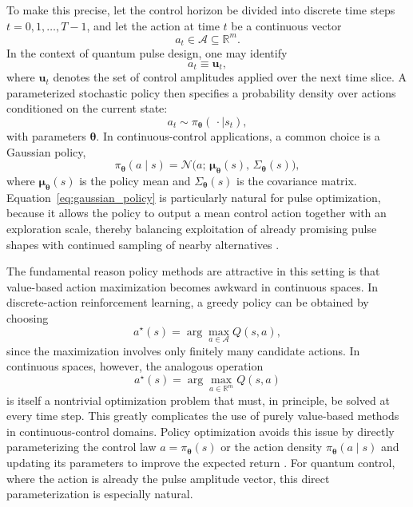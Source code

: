 To make this precise, let the control horizon be divided into discrete time steps $t=0,1,\dots,T-1$, and let the action at time $t$ be a continuous vector
\begin{equation}
a_t \in \mathcal{A} \subseteq \mathbb{R}^{m}.
\label{eq:continuous_action_space}
\end{equation}
In the context of quantum pulse design, one may identify
\begin{equation}
a_t \equiv \bm{u}_t,
\label{eq:action_as_control_vector}
\end{equation}
where $\bm{u}_t$ denotes the set of control amplitudes applied over the next time slice. A parameterized stochastic policy then specifies a probability density over actions conditioned on the current state:
\begin{equation}
a_t \sim \pi_{\bm{\theta}}(\,\cdot \mid s_t),
\label{eq:stochastic_policy_sampling}
\end{equation}
with parameters $\bm{\theta}$. In continuous-control applications, a common choice is a Gaussian policy,
\begin{equation}
\pi_{\bm{\theta}}(a\mid s)
=
\mathcal{N}\!\bigl(a;\,\bm{\mu}_{\bm{\theta}}(s),\,\Sigma_{\bm{\theta}}(s)\bigr),
\label{eq:gaussian_policy}
\end{equation}
where $\bm{\mu}_{\bm{\theta}}(s)$ is the policy mean and $\Sigma_{\bm{\theta}}(s)$ is the covariance matrix. Equation~\eqref{eq:gaussian_policy} is particularly natural for pulse optimization, because it allows the policy to output a mean control action together with an exploration scale, thereby balancing exploitation of already promising pulse shapes with continued sampling of nearby alternatives \cite{SuttonBarto2018,Schulman2015}.

The fundamental reason policy methods are attractive in this setting is that value-based action maximization becomes awkward in continuous spaces. In discrete-action reinforcement learning, a greedy policy can be obtained by choosing
\begin{equation}
a^{\star}(s)
=
\arg\max_{a\in\mathcal{A}} Q(s,a),
\label{eq:discrete_greedy_action}
\end{equation}
since the maximization involves only finitely many candidate actions. In continuous spaces, however, the analogous operation
\begin{equation}
a^{\star}(s)
=
\arg\max_{a\in\mathbb{R}^{m}} Q(s,a)
\label{eq:continuous_action_maximization}
\end{equation}
is itself a nontrivial optimization problem that must, in principle, be solved at every time step. This greatly complicates the use of purely value-based methods in continuous-control domains. Policy optimization avoids this issue by directly parameterizing the control law $a=\pi_{\bm{\theta}}(s)$ or the action density $\pi_{\bm{\theta}}(a\mid s)$ and updating its parameters to improve the expected return \cite{Silver2014,SuttonBarto2018}. For quantum control, where the action is already the pulse amplitude vector, this direct parameterization is especially natural.


